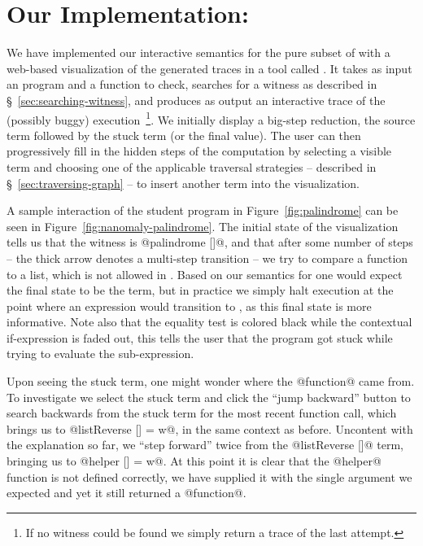 \section{Our Implementation: \nanomaly}
\label{sec:impl-nanomaly}
We have implemented our interactive semantics for the pure subset of
\ocaml with a web-based visualization of the generated traces in a tool
called \nanomaly.
%
It takes as input an \ocaml program and a function to check, searches
for a witness as described in \S~\ref{sec:searching-witness}, and
produces as output an interactive trace of the (possibly buggy)
execution~\footnote{If no witness could be found we simply return a trace
  of the last attempt.}.
%
We initially display a big-step reduction, \ie the source term followed
by the stuck term (or the final value).
%
The user can then progressively fill in the hidden steps of the
computation by selecting a visible term and choosing one of the
applicable traversal strategies -- described in
\S~\ref{sec:traversing-graph} -- to insert another term into the
visualization.

A sample interaction of the student program in
Figure~\ref{fig:palindrome} can be seen in
Figure~\ref{fig:nanomaly-palindrome}.
%
The initial state of the visualization tells us that the witness is
@palindrome []@, and that after some number of steps -- the thick arrow
denotes a multi-step transition -- we try to compare a function to a
list, which is not allowed in \ocaml.
%
Based on our semantics for \lang one would expect the final state to be
the \stuck term, but in practice we simply halt execution at the point
where an expression would transition to \stuck, as this final state is
more informative.
%
Note also that the equality test is colored black while the contextual
if-expression is faded out, this tells the user that the program got
stuck while trying to evaluate the sub-expression.

Upon seeing the stuck term, one might wonder where the @function@
came from.
%
To investigate we select the stuck term and click the ``jump backward''
button to search backwards from the stuck term for the most recent
function call, which brings us to @listReverse [] = w@, in the same
context as before.
%
Uncontent with the explanation so far, we ``step forward'' twice from
the @listReverse []@ term, bringing us to @helper [] = w@.
%
At this point it is clear that the @helper@ function is not defined
correctly, we have supplied it with the single argument we expected and
yet it still returned a @function@.

